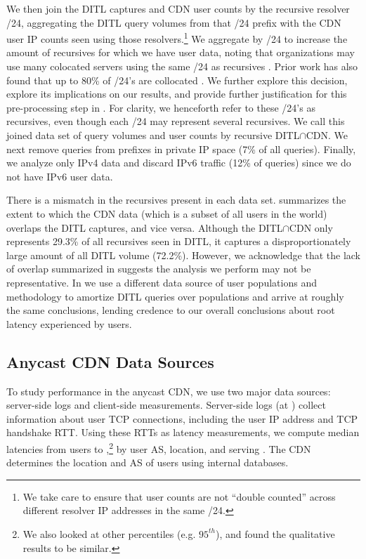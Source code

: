 \documentclass[sigconf,letterpaper,nonacm,10pt,anonymous]{acmart}
\begin{document}
We then join the DITL captures and CDN user counts by the recursive
resolver /24, aggregating the DITL query volumes from that /24 prefix
with the CDN user IP counts seen using those resolvers.\footnote{We take
  care to ensure that user counts are not ``double counted'' across
  different resolver IP addresses in the same /24.} We aggregate by /24
to increase the amount of recursives for which we have user data, noting
that organizations may use many colocated servers using the same /24 as
recursives \cite{google_public_dns, opendns_public_dns}. Prior work has
also found that up to 80\% of /24's are collocated
\cite{gharaibeh_colocation_24}. We further explore this decision,
explore its implications on our results, and provide further
justification for this pre-processing step in . For
clarity, we henceforth refer to these /24's as recursives, even though
each /24 may represent several recursives. We call this joined data set
of query volumes and user counts by recursive DITL\(\cap\)CDN. We next
remove queries from prefixes in private IP space \cite{private_ips} (7\%
of all queries). Finally, we analyze only IPv4 data and discard IPv6
traffic (12\% of queries) since we do not have IPv6 user data.

There is a mismatch in the recursives present in each data set.
 summarizes the extent to which
the CDN data (which is a subset of all users in the world) overlaps the
DITL captures, and vice versa. Although the DITL\(\cap\)CDN only
represents 29.3\% of all recursives seen in DITL, it captures a
disproportionately large amount of all DITL volume (72.2\%). However, we
acknowledge that the lack of overlap summarized in
 suggests the analysis we perform
may not be representative. In  we
use a different data source of user populations and methodology to
amortize DITL queries over populations and arrive at roughly the same
conclusions, lending credence to our overall conclusions about root
latency experienced by users.

\subsection{Anycast CDN Data Sources}\label{anycast-cdn-data-sources-1}

\label{sec:cdn_data_sources} To study performance in the anycast CDN, we
use two major data sources: server-side logs and client-side
measurements. Server-side logs (\ie at \feplural) collect information
about user TCP connections, including the user IP address and TCP
handshake RTT. Using these RTTs as latency measurements, we compute
median latencies from users to \feplural,\footnote{We also looked at
  other percentiles (e.g. \(95^{th}\)), and found the qualitative
  results to be similar.} by user AS, location, and serving \fe. The CDN
determines the location and AS of users using internal databases.
\end{document}
